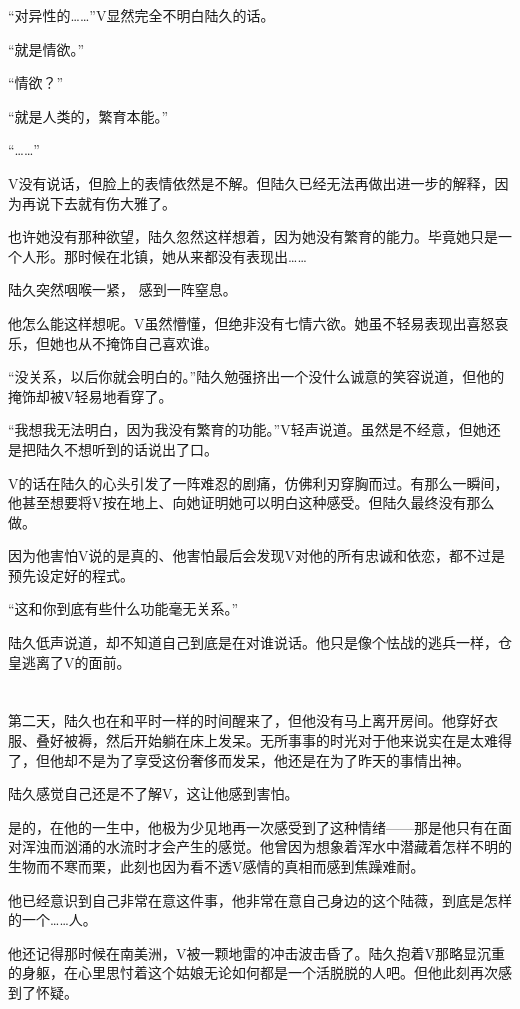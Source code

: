 “对异性的……”V显然完全不明白陆久的话。

“就是情欲。”

“情欲？”

“就是人类的，繁育本能。”

“……”

V没有说话，但脸上的表情依然是不解。但陆久已经无法再做出进一步的解释，因为再说下去就有伤大雅了。

也许她没有那种欲望，陆久忽然这样想着，因为她没有繁育的能力。毕竟她只是一个人形。那时候在北镇，她从来都没有表现出……

陆久突然咽喉一紧， 感到一阵窒息。

他怎么能这样想呢。V虽然懵懂，但绝非没有七情六欲。她虽不轻易表现出喜怒哀乐，但她也从不掩饰自己喜欢谁。

“没关系，以后你就会明白的。”陆久勉强挤出一个没什么诚意的笑容说道，但他的掩饰却被V轻易地看穿了。

“我想我无法明白，因为我没有繁育的功能。”V轻声说道。虽然是不经意，但她还是把陆久不想听到的话说出了口。

V的话在陆久的心头引发了一阵难忍的剧痛，仿佛利刃穿胸而过。有那么一瞬间，他甚至想要将V按在地上、向她证明她可以明白这种感受。但陆久最终没有那么做。

因为他害怕V说的是真的、他害怕最后会发现V对他的所有忠诚和依恋，都不过是预先设定好的程式。

“这和你到底有些什么功能毫无关系。”

陆久低声说道，却不知道自己到底是在对谁说话。他只是像个怯战的逃兵一样，仓皇逃离了V的面前。

\section*{}

第二天，陆久也在和平时一样的时间醒来了，但他没有马上离开房间。他穿好衣服、叠好被褥，然后开始躺在床上发呆。无所事事的时光对于他来说实在是太难得了，但他却不是为了享受这份奢侈而发呆，他还是在为了昨天的事情出神。

陆久感觉自己还是不了解V，这让他感到害怕。

是的，在他的一生中，他极为少见地再一次感受到了这种情绪——那是他只有在面对浑浊而汹涌的水流时才会产生的感觉。他曾因为想象着浑水中潜藏着怎样不明的生物而不寒而栗，此刻也因为看不透V感情的真相而感到焦躁难耐。

他已经意识到自己非常在意这件事，他非常在意自己身边的这个陆薇，到底是怎样的一个……人。

他还记得那时候在南美洲，V被一颗地雷的冲击波击昏了。陆久抱着V那略显沉重的身躯，在心里思忖着这个姑娘无论如何都是一个活脱脱的人吧。但他此刻再次感到了怀疑。

